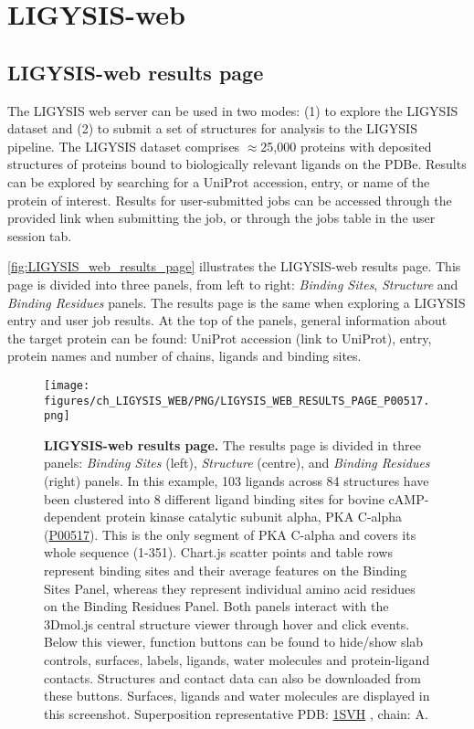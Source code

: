 \section{LIGYSIS-web}

\subsection{LIGYSIS-web results page}

The LIGYSIS web server can be used in two modes: (1) to explore the LIGYSIS dataset and (2) to submit a set of structures for analysis to the LIGYSIS pipeline. The LIGYSIS dataset comprises $\approx$25,000 proteins with deposited structures of proteins bound to biologically relevant ligands on the PDBe. Results can be explored by searching for a UniProt accession, entry, or name of the protein of interest. Results for user-submitted jobs can be accessed through the provided link when submitting the job, or through the jobs table in the user session tab.

\autoref{fig:LIGYSIS_web_results_page} illustrates the LIGYSIS-web results page. This page is divided into three panels, from left to right: \textit{Binding Sites}, \textit{Structure} and \textit{Binding Residues} panels. The results page is the same when exploring a LIGYSIS entry and user job results. At the top of the panels, general information about the target protein can be found: UniProt accession (link to UniProt), entry, protein names and number of chains, ligands and binding sites.

\begin{figure}[htb!]
    \centering
    \texttt{[image: figures/ch\_LIGYSIS\_WEB/PNG/LIGYSIS\_WEB\_RESULTS\_PAGE\_P00517.png]}
    \caption[LIGYSIS-web results page]{\textbf{LIGYSIS-web results page.} The results page is divided in three panels: \textit{Binding Sites} (left), \textit{Structure} (centre), and \textit{Binding Residues} (right) panels. In this example, 103 ligands across 84 structures have been clustered into 8 different ligand binding sites for bovine cAMP-dependent protein kinase catalytic subunit alpha, PKA C-alpha (\href{https://www.uniprot.org/uniprotkb/P00517/entry}{P00517}). This is the only segment of PKA C-alpha and covers its whole sequence (1-351). Chart.js scatter points and table rows represent binding sites and their average features on the Binding Sites Panel, whereas they represent individual amino acid residues on the Binding Residues Panel. Both panels interact with the 3Dmol.js central structure viewer through hover and click events. Below this viewer, function buttons can be found to hide/show slab controls, surfaces, labels, ligands, water molecules and protein-ligand contacts. Structures and contact data can also be downloaded from these buttons. Surfaces, ligands and water molecules are displayed in this screenshot. Superposition representative PDB: \href{https://www.ebi.ac.uk/pdbe/entry/pdb/1svh}{1SVH} \cite{BREITENLECHNER_2004_PKB}, chain: A.}
    \label{fig:LIGYSIS_web_results_page}
\end{figure}


